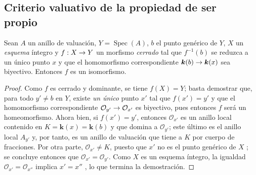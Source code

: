 \documentclass[oneside,10pt]{amsart}
\makeatletter
\newcommand{\ega@arrow}[2]{\mathchoice{#1}{#2}{#2}{#2}}
\renewcommand{\to}{\ega@arrow{\longrightarrow}{\rightarrow}}
\newcommand{\oldpage}[2][]{\marginnote{\normalfont\footnotesize\textbf{#1}~|~#2}\ignorespaces}
\let\EGAOriginalLabel\label
\renewcommand{\label}[1]{\phantomsection\EGAOriginalLabel{#1}}
\makeatother
\begin{document}

\oldpage[II]{143}

\subsection{Criterio valuativo de la propiedad de ser propio}
\label{subsection:II.7.3-fr}

\begin{proposition}[7.3.1]
\label{II.7.3.1-fr}
Sean $A$ un anillo de valuación, $Y=\operatorname{Spec}(A)$, $b$ el punto genérico de $Y$, $X$ un \emph{esquema} íntegro y $f:X\to Y$ un morfismo \emph{cerrado} tal que $f^{-1}(b)$ se reduzca a un único punto $x$ y que el homomorfismo correspondiente $\boldsymbol{k}(b)\to \boldsymbol{k}(x)$ sea biyectivo.
Entonces $f$ es un isomorfismo.
\end{proposition}

\begin{proof}
Como $f$ es cerrado y dominante, se tiene $f(X)=Y$;
basta  demostrar que, para todo $y'\neq b$ en $Y$, existe \emph{un único} punto $x'$ tal que $f(x')=y'$ y que el homomorfismo correspondiente $\mathcal{O}_{y'}\to\mathcal{O}_{x'}$ es biyectivo, pues entonces $f$ será un homeomorfismo.
Ahora bien, si $f(x')=y'$, entonces $\mathcal{O}_{x'}$ es un anillo local contenido en
$K=\boldsymbol{k}(x)=\boldsymbol{k}(b)$
y que domina a $\mathcal{O}_{y'}$;
este último es el anillo local $A_{y'}$ y, por tanto, es un anillo de valuación  que tiene a $K$ por cuerpo de fracciones.
Por otra parte, $\mathcal{O}_{x'}\neq K$, puesto que $x'$ no es el punto genérico de $X$ ;
se concluye entonces que $\mathcal{O}_{x'}=\mathcal{O}_{y'}$.
Como $X$ es un esquema íntegro, la igualdad $\mathcal{O}_{x'}=\mathcal{O}_{x''}$ implica $x'=x''$ , lo que termina la demostración.
\end{proof}
\end{document}
